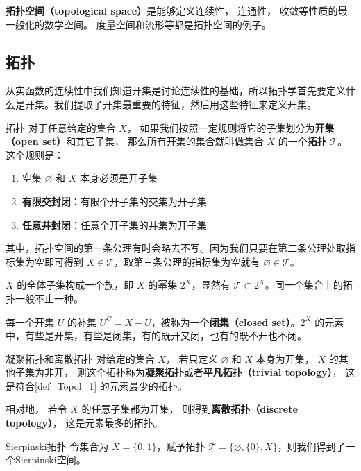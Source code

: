 

\textbf{拓扑空间（topological space）}是能够定义连续性， 连通性， 收敛等性质的最一般化的数学空间。 度量空间和流形等都是拓扑空间的例子。

\subsection{拓扑}

从实函数的连续性中我们知道开集是讨论连续性的基础，所以拓扑学首先要定义什么是开集。我们提取了开集最重要的特征，然后用这些特征来定义开集。

\begin{definition}{拓扑}\label{def_Topol_1}
对于任意给定的集合 $X$， 如果我们按照一定规则将它的子集划分为\textbf{开集（open set）}和其它子集， 那么所有开集的集合就叫做集合 $X$ 的一个\textbf{拓扑} $\mathcal{T}$。 这个规则是：
\begin{enumerate}
\item 空集 $\varnothing$ 和 $X$ 本身必须是开子集
\item \textbf{有限交封闭}：有限个开子集的交集为开子集
\item \textbf{任意并封闭}：任意个开子集的并集为开子集
\end{enumerate}
\end{definition}

其中，拓扑空间的第一条公理有时会略去不写。因为我们只要在第二条公理处取指标集为空即可得到 $X \in \mathcal{T}$，取第三条公理的指标集为空就有 $\varnothing \in \mathcal{T}$。

$X$ 的全体子集构成一个族，即 $X$ 的幂集 $2^X$，显然有 $\mathcal{T}\subset2^X$。同一个集合上的拓扑一般不止一种。

每一个开集 $U$ 的补集 $U^C=X-U$，被称为一个\textbf{闭集（closed set）}。$2^X$ 的元素中，有些是开集，有些是闭集，有的既开又闭，也有的既不开也不闭。

\begin{example}{凝聚拓扑和离散拓扑}
对给定的集合 $X$， 若只定义 $\varnothing$ 和 $X$ 本身为开集， $X$ 的其他子集为非开， 则这个拓扑称为\textbf{凝聚拓扑}或者\textbf{平凡拓扑（trivial topology）}， 这是符合\autoref{def_Topol_1} 的元素最少的拓扑。

相对地， 若令 $X$ 的任意子集都为开集， 则得到\textbf{离散拓扑（discrete topology）}， 这是元素最多的拓扑。
\end{example}

\begin{example}{Sierpinski拓扑}
令集合为 $X=\{0, 1\}$，赋予拓扑 $\mathcal{T}=\{\varnothing, \{0\}, X\}$，则我们得到了一个Sierpinski空间。
\end{example}

